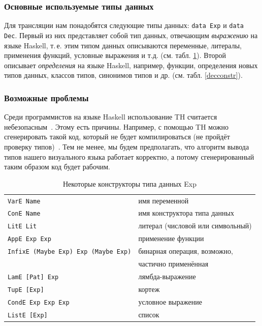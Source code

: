 	\subsubsection{Основные используемые типы данных} Для трансляции нам понадобятся следующие типы данных: \lstinline!data Exp! и \lstinline!data Dec!. Первый из них представляет собой тип данных, отвечающим \textit{выражению} на языке Haskell, т.\,е. этим типом данных описываются переменные, литералы, применения функций, условные выражения и т.д. (см. табл. \ref{expconstr}). Второй описывает \textit{определения} на языке Haskell, например, функции, определения новых типов данных, классов типов, синонимов типов и др. (см. табл. \ref{decconstr}).
	
	\subsubsection{Возможные проблемы} Среди программистов на языке Haskell использование TH считается небезопасным~\autocite{ugly}. Этому есть причины. Например, с помощью TH можно сгенерировать такой код, который не будет компилироваться (не пройдёт проверку типов)~\autocite{whatsbad}. Тем не менее, мы будем предполагать, что алгоритм вывода типов нашего визуального языка работает корректно, а потому сгенерированный таким образом код будет рабочим.
	
\begin{table}[h]
	\begin{center}
		\begin{tabular}{ll}
			{\lstinline!VarE Name!} & имя переменной \\
			{\lstinline!ConE Name!} & имя конструктора типа данных \\
			{\lstinline!LitE Lit!} & литерал (числовой или символьный) \\
			{\lstinline!AppE Exp Exp!} & применение функции \\
			{\lstinline!InfixE (Maybe Exp) Exp (Maybe Exp)!} & бинарная операция, возможно, \\ & частично применённая \\
			{\lstinline!LamE [Pat] Exp!} & лямбда-выражение \\
			{\lstinline!TupE [Exp]!} & кортеж \\
			{\lstinline!CondE Exp Exp Exp!} & условное выражение \\
			{\lstinline!ListE [Exp]!} & список \\
		\end{tabular}
	\end{center}
\caption{Некоторые конструкторы типа данных Exp}
\label{expconstr}
\end{table}

